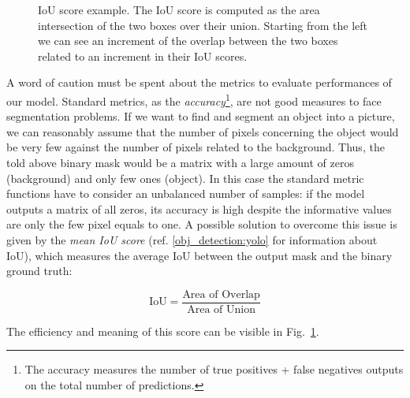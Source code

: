 \documentclass{standalone}
\begin{document}
\begin{center}
\begin{figure}[htbp]
\centering
\def\svgwidth{0.85\textwidth}

\caption{IoU score example.
The IoU score is computed as the area intersection of the two boxes over their union.
Starting from the left we can see an increment of the overlap between the two boxes related to an increment in their IoU scores.
}
\label{fig:iou_example}
\end{figure}
\end{center}

A word of caution must be spent about the metrics to evaluate performances of our model.
Standard metrics, as the \emph{accuracy}\footnote{
  The accuracy measures the number of true positives + false negatives outputs on the total number of predictions.
}, are not good measures to face segmentation problems.
If we want to find and segment an object into a picture, we can reasonably assume that the number of pixels concerning the object would be very few against the number of pixels related to the background.
Thus, the told above binary mask would be a matrix with a large amount of zeros (background) and only few ones (object).
In this case the standard metric functions have to consider an unbalanced number of samples: if the model outputs a matrix of all zeros, its accuracy is high despite the informative values are only the few pixel equals to one.
A possible solution to overcome this issue is given by the \emph{mean IoU score} (ref. \ref{obj_detection:yolo} for information about IoU), which measures the average IoU between the output mask and the binary ground truth:

$$
\mbox{IoU} = \frac{\mbox{Area of Overlap}}{\mbox{Area of Union}}
$$

The efficiency and meaning of this score can be visible in Fig.~\ref{fig:iou_example}.
\end{document}
